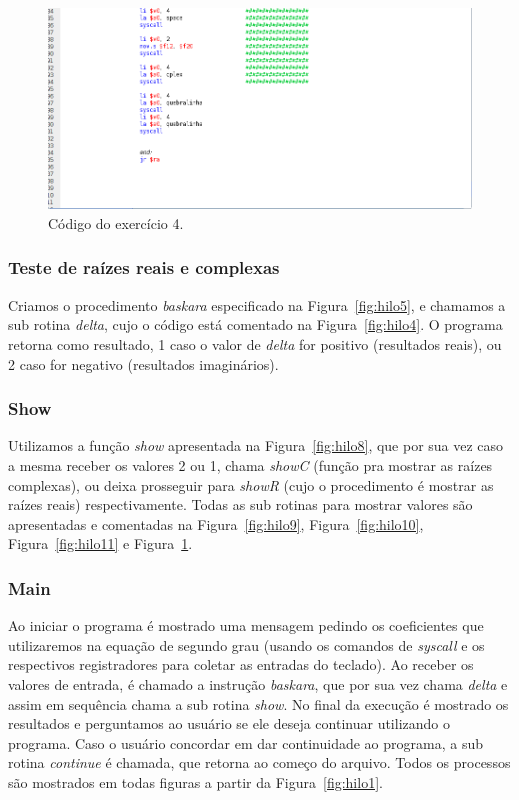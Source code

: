 \documentclass[12pt]{article}
\begin{document}
\begin{figure}[H]
	\centering
	\includegraphics[width=1\textwidth]{EX_4_12.png}
	\caption{Código do exercício 4.}
	\label{fig:hilo12}
\end{figure}

\subsubsection{Teste de raízes reais e complexas}
\label{subsubsec:testebhas}

Criamos o procedimento \textit{baskara} especificado na Figura~\ref{fig:hilo5}, e chamamos a sub rotina \textit{delta}, cujo o código está comentado na Figura~\ref{fig:hilo4}. O programa retorna como resultado, 1 caso o valor de \textit{delta} for positivo (resultados reais), ou 2 caso for negativo (resultados imaginários).

\subsubsection{Show}
\label{subsubsec:show}

Utilizamos a função \textit{show} apresentada na Figura~\ref{fig:hilo8}, que por sua vez caso a mesma receber os valores 2 ou 1, chama \textit{showC} (função pra mostrar as raízes complexas), ou deixa prosseguir para \textit{showR} (cujo o procedimento é mostrar as raízes reais) respectivamente. Todas as sub rotinas para mostrar valores são apresentadas e comentadas na Figura~\ref{fig:hilo9},  Figura~\ref{fig:hilo10}, Figura~\ref{fig:hilo11} e Figura~\ref{fig:hilo12}.

\subsubsection{Main}
\label{subsubsec:Main}

Ao iniciar o programa é mostrado uma mensagem pedindo os coeficientes que utilizaremos na equação de segundo grau (usando os comandos de \textit{syscall} e os respectivos registradores para coletar as entradas do teclado). Ao receber os valores de entrada, é chamado a instrução \textit{baskara}, que por sua vez chama \textit{delta} e assim em sequência chama a sub rotina \textit{show}. No final da execução é mostrado os resultados e perguntamos ao usuário se ele deseja continuar utilizando o programa. Caso o usuário concordar em dar continuidade ao programa, a sub rotina \textit{continue} é chamada, que retorna ao começo do arquivo. Todos os processos são mostrados em todas figuras a partir da Figura~\ref{fig:hilo1}.
\end{document}

